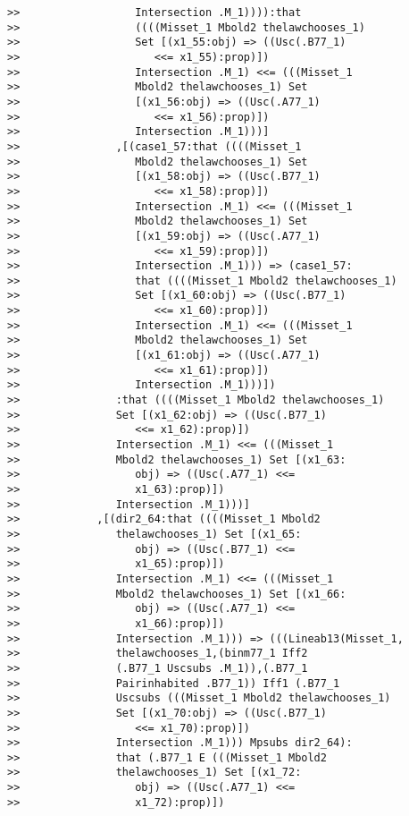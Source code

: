 \documentclass[12pt]{article}
\begin{document}
\begin{verbatim}
>>                  Intersection .M_1)))):that
>>                  ((((Misset_1 Mbold2 thelawchooses_1)
>>                  Set [(x1_55:obj) => ((Usc(.B77_1)
>>                     <<= x1_55):prop)])
>>                  Intersection .M_1) <<= (((Misset_1
>>                  Mbold2 thelawchooses_1) Set
>>                  [(x1_56:obj) => ((Usc(.A77_1)
>>                     <<= x1_56):prop)])
>>                  Intersection .M_1)))]
>>               ,[(case1_57:that ((((Misset_1
>>                  Mbold2 thelawchooses_1) Set
>>                  [(x1_58:obj) => ((Usc(.B77_1)
>>                     <<= x1_58):prop)])
>>                  Intersection .M_1) <<= (((Misset_1
>>                  Mbold2 thelawchooses_1) Set
>>                  [(x1_59:obj) => ((Usc(.A77_1)
>>                     <<= x1_59):prop)])
>>                  Intersection .M_1))) => (case1_57:
>>                  that ((((Misset_1 Mbold2 thelawchooses_1)
>>                  Set [(x1_60:obj) => ((Usc(.B77_1)
>>                     <<= x1_60):prop)])
>>                  Intersection .M_1) <<= (((Misset_1
>>                  Mbold2 thelawchooses_1) Set
>>                  [(x1_61:obj) => ((Usc(.A77_1)
>>                     <<= x1_61):prop)])
>>                  Intersection .M_1)))])
>>               :that ((((Misset_1 Mbold2 thelawchooses_1)
>>               Set [(x1_62:obj) => ((Usc(.B77_1)
>>                  <<= x1_62):prop)])
>>               Intersection .M_1) <<= (((Misset_1
>>               Mbold2 thelawchooses_1) Set [(x1_63:
>>                  obj) => ((Usc(.A77_1) <<=
>>                  x1_63):prop)])
>>               Intersection .M_1)))]
>>            ,[(dir2_64:that ((((Misset_1 Mbold2
>>               thelawchooses_1) Set [(x1_65:
>>                  obj) => ((Usc(.B77_1) <<=
>>                  x1_65):prop)])
>>               Intersection .M_1) <<= (((Misset_1
>>               Mbold2 thelawchooses_1) Set [(x1_66:
>>                  obj) => ((Usc(.A77_1) <<=
>>                  x1_66):prop)])
>>               Intersection .M_1))) => (((Lineab13(Misset_1,
>>               thelawchooses_1,(binm77_1 Iff2
>>               (.B77_1 Uscsubs .M_1)),(.B77_1
>>               Pairinhabited .B77_1)) Iff1 (.B77_1
>>               Uscsubs (((Misset_1 Mbold2 thelawchooses_1)
>>               Set [(x1_70:obj) => ((Usc(.B77_1)
>>                  <<= x1_70):prop)])
>>               Intersection .M_1))) Mpsubs dir2_64):
>>               that (.B77_1 E (((Misset_1 Mbold2
>>               thelawchooses_1) Set [(x1_72:
>>                  obj) => ((Usc(.A77_1) <<=
>>                  x1_72):prop)])

\end{verbatim}
\end{document}
